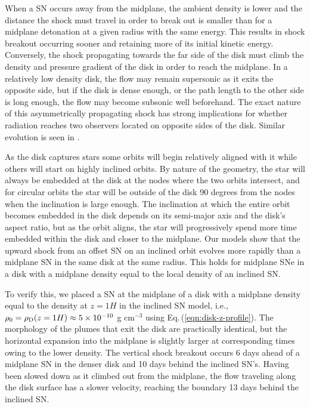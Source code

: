 When a SN occurs away from the midplane, the ambient density is lower and the distance the shock must travel in order to break out is smaller than for a midplane detonation at a given radius with the same energy.
This results in shock breakout occurring sooner and retaining more of its initial kinetic energy.
Conversely, the shock propagating towards the far side of the disk must climb the density and pressure gradient of the disk in order to reach the midplane.
In a relatively low density disk, the flow may remain supersonic as it exits the opposite side, but if the disk is dense enough, or the path length to the other side is long enough, the flow may become subsonic well beforehand.
The exact nature of this asymmetrically propagating shock has strong implications for whether radiation reaches two observers located on opposite sides of the disk.
Similar evolution is seen in \citet{Grishin+21}.

As the disk captures stars \citep{MacLeodLin20,Nasim+22} some orbits will begin relatively aligned with it while others will start on highly inclined orbits.
By nature of the geometry, the star will always be embedded at the disk at the nodes where the two orbits intersect, and for circular orbits the star will be outside of the disk 90 degrees from the nodes when the inclination is large enough.
The inclination at which the entire orbit becomes embedded in the disk depends on its semi-major axis and the disk's aspect ratio, but as the orbit aligns, the star will progressively spend more time embedded within the disk and closer to the midplane.
Our models show that the upward shock from an offset SN on an inclined orbit evolves more rapidly than a midplane SN in the same disk at the same radius.
This holds for midplane SNe in a disk with a midplane density equal to the local density of an inclined SN.

To verify this, we placed a SN at the midplane of a disk with a midplane density equal to the density at $z=1H$ in the inclined SN model, i.e., $\rho_0=\rho_{\rm D}(z=1H)\approx5\times10^{-10}$ g cm$^{-3}$ using Eq.\,(\ref{eqn:disk-z-profile}).
The morphology of the plumes that exit the disk are practically identical, but the horizontal expansion into the midplane is slightly larger at corresponding times owing to the lower density.
The vertical shock breakout occurs 6 days ahead of a midplane SN in the denser disk and 10 days behind the inclined SN's. Having been slowed down as it climbed out from the midplane, the flow traveling along the disk surface has a slower velocity, reaching the boundary 13 days behind the inclined SN.


